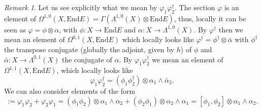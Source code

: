 \documentclass[12pt,a4paper]{book}
\theoremstyle{definition} \newtheorem{defn}[thm]{Definition}
\theoremstyle{definition} \newtheorem{ejemplo}[thm]{Example}
\theoremstyle{remark} \newtheorem{rem}[thm]{Remark}
\def\End{\mathrm{End}}
\begin{document}
	  \begin{rem}\label{obsproducto}
	    Let us see explicitly what we mean by $\varphi_1\varphi_2^\dagger$. The section $\varphi$ is an element of $\Omega^{1,0}(X,\End E)=\Gamma(\Lambda^{1,0}(X)\otimes\End E)$, thus, locally it can be seen as $\varphi=\phi \otimes \alpha$, with $\phi: X \rightarrow \End E$ and $\alpha:X\rightarrow \Lambda^{1,0}(X)$. By $\varphi^\dagger$ then we mean an element of $\Omega^{0,1}(X,\End E)$ which locally looks like $\varphi^\dagger=\phi^{\dagger} \otimes \bar{\alpha}$ with $\phi^{\dagger}$ the transpose conjugate (globally the adjoint, given by $h$) of $\phi$ and $\bar{\alpha}:X\rightarrow \Lambda^{0,1}(X)$ the conjugate of $\alpha$. By $\varphi_1 \varphi_2^\dagger$ we mean an element of $\Omega^{1,1}(X,\End E)$, which locally looks like
	    \begin{equation*}
	      \varphi_1 \varphi_2^\dagger=(\phi_1\phi_2^{\dagger})\otimes \alpha_1 \wedge \bar{\alpha}_2.
	    \end{equation*}
	    We can also consider elements of the form
	    \begin{equation*}
	      [\varphi_1, \varphi_2] := \varphi_1 \varphi_2 + \varphi_2 \varphi_1 = (\phi_1\phi_2)\otimes \alpha_1 \wedge \alpha_2 + (\phi_2 \phi_1) \otimes \alpha_2 \wedge \alpha_1=[\phi_1,\phi_2] \otimes \alpha_1 \wedge \alpha_2.
	    \end{equation*}
	  \end{rem}
	  
\end{document}
